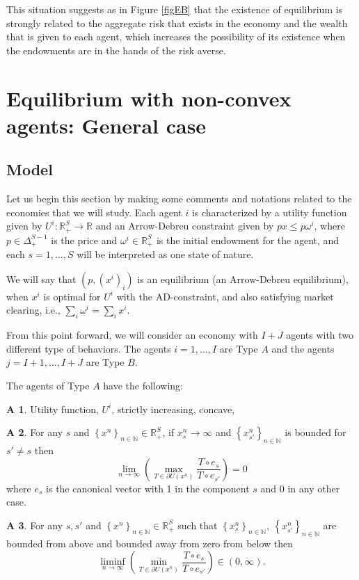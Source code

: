 \documentclass[pdftex]{article}
\numberwithin{equation}{section}
\theoremstyle{th}
\newtheorem{proof lemma}{{Proof Lemma}.}
\theoremstyle{definition}
\newtheorem{A}{A\hspace{-0.15cm}}
\newtheorem*{risk lovers}{Risk lovers}
\newtheorem*{risk averse}{Risk averse}
\begin{document}
This situation suggests as in Figure \ref{figEB} that the existence of equilibrium is strongly related to the aggregate risk that exists in the economy and the wealth that is given to each agent, which increases the possibility of its existence when the endowments are in the hands of the risk averse.




\section{Equilibrium with non-convex agents: General case}
\label{section2}
\subsection{Model}
Let us begin this section by making some comments and notations related to the economies that we will study. Each agent $i$ is characterized by a utility function given by $U^i:\mathbb{R}^S_+\rightarrow\mathbb{R}$ and an Arrow-Debreu constraint given by $px\leq{p}\omega^i$, where $p\in\Delta^{S-1}_+$ is the price and $\omega^i\in \mathbb{R}^S_+$ is the initial endowment for the agent, and each $s=1,\dots,S$ will be interpreted as one state of nature.

We will say that $\left(p,\left(x^i\right)_i\right)$ is an equilibrium (an Arrow-Debreu equilibrium), when $x^i$ is optimal for $U^i$ with the AD-constraint, and also satisfying market clearing, i.e., $\sum_i\omega^i=\sum_ix^i.$



From this point forward, we will consider an economy with $I+J$ agents with two different type of behaviors. The agents $i=1,\dots,I$ are Type $A$ and the agents $j=I+1,\dots,I+J$ are Type $B$.

The agents of Type $A$ have the following:
\begin{A} \label{A1}Utility function, $U^i$, strictly increasing, concave,\end{A}
\begin{A} \label{eqc1} For any $s$ and $\left\{x^n\right\}_{n\in\mathbb{N}}\in\mathbb{R}^S_{+}$, if $x^n_s\rightarrow\infty$ and $\left\{x^n_{s'}\right\}_{n\in\mathbb{N}}$ is bounded for $s'\neq{s}$ then\begin{equation}
\lim_{n\rightarrow\infty}\left(\max_{T\in\partial{U\left(x^n\right)}}\frac{T\circ{e}_s}{T\circ{e}_{s'}}\right)=0\end{equation}where $e_s$ is the canonical vector with 1 in the component $s$ and 0 in any other case.\end{A} \begin{A}\label{eqc2} For any $s,s'$ and $\left\{x^n\right\}_{n\in\mathbb{N}}\in\mathbb{R}^S_{+}$ such that $\left\{x^n_{s}\right\}_{n\in\mathbb{N}},\ \left\{x^n_{s'}\right\}_{n\in\mathbb{N}}$ are bounded from above and bounded away from zero from below then\begin{equation}\liminf_{n\rightarrow\infty}\left(\min_{T\in\partial{U\left(x^n\right)}}\frac{T\circ{e}_{s}}{T\circ{e}_{s'}}\right)\in(0,\infty).\end{equation}
\end{A}
\end{document}
